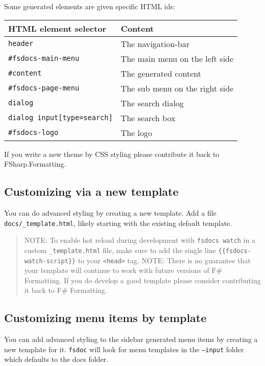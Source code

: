 \documentclass{article}
\begin{document}
Some generated elements are given specific HTML ids:
\begin{tabular}{|l|l|}\hline
\textbf{HTML element selector} & \textbf{Content}\\ \hline\hline
\texttt{header} & The navigation-bar\\ \hline
\texttt{\#fsdocs-main-menu} & The main menu on the left side\\ \hline
\texttt{\#content} & The generated content\\ \hline
\texttt{\#fsdocs-page-menu} & The sub menu on the right side\\ \hline
\texttt{dialog} & The search dialog\\ \hline
\texttt{dialog input[type=search]} & The search box\\ \hline
\texttt{\#fsdocs-logo} & The logo\\ \hline
\end{tabular}



If you write a new theme by CSS styling please contribute it back to FSharp.Formatting.
\subsection*{Customizing via a new template}



You can do advanced styling by creating a new template. Add a file \texttt{docs/\_template.html}, likely starting
with the existing default template.
\begin{quote}


NOTE: To enable hot reload during development with \texttt{fsdocs watch} in a custom \texttt{\_template.html} file,
make sure to add the single line \texttt{\{\{fsdocs-watch-script\}\}}  to your \texttt{<head>} tag.
NOTE: There is no guarantee that your template will continue to work with future versions of F\# Formatting.
If you do develop a good template please consider contributing it back to F\# Formatting.
\end{quote}

\subsection*{Customizing menu items by template}



You can add advanced styling to the sidebar generated menu items by creating a new template for it.
\texttt{fsdoc} will look for menu templates in the \texttt{--input} folder which defaults to the docs folder.
\end{document}
